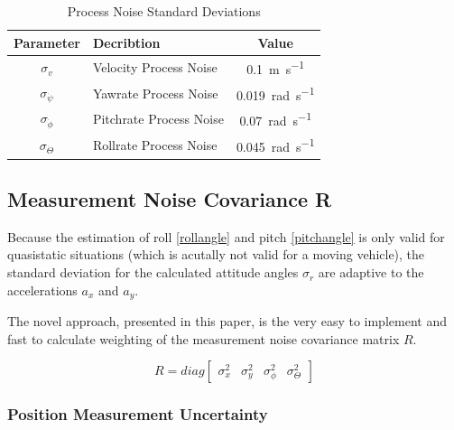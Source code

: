\documentclass[conference]{IEEEtran}
\begin{document}
\begin{table}[ht]
\renewcommand{\arraystretch}{1.3}
\caption{Process Noise Standard Deviations}
\label{processnoisetable}
\centering
\begin{tabular}{c l c}
\hline
Parameter & Decribtion & Value\\
\hline
$\sigma_v$ & Velocity Process Noise & \SI{0.1}{\metre\per\second} \\
$\sigma_{\dot \psi}$ & Yawrate Process Noise & \SI{0.019}{\radian\per\second}\\
$\sigma_{\dot \phi}$ & Pitchrate Process Noise & \SI{0.07}{\radian\per\second}\\
$\sigma_{\dot \Theta}$ & Rollrate Process Noise & \SI{0.045}{\radian\per\second}\\
\hline
\end{tabular}
\end{table}

\subsection{Measurement Noise Covariance R}

Because the estimation of roll \eqref{rollangle} and pitch \eqref{pitchangle} is only valid for quasistatic situations (which is acutally not valid for a moving vehicle), the standard deviation for the calculated attitude angles $\sigma_r$ are adaptive to the accelerations $a_x$ and $a_y$.

The novel approach, presented in this paper, is the very easy to implement and fast to calculate weighting of the measurement noise covariance matrix $R$.

\begin{equation}\label{R}R=diag\left[\begin{matrix}\sigma_{x}^2 & \sigma_{y}^2 & \sigma_{\phi}^2 & \sigma_{\Theta}^2 \end{matrix}\right]\end{equation}

\subsubsection{Position Measurement Uncertainty}
\end{document}
